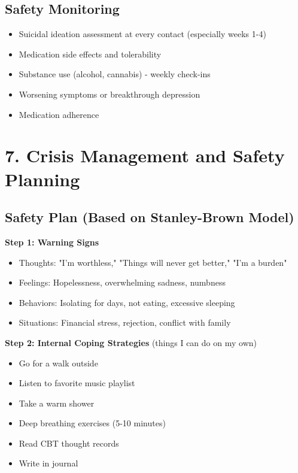 \documentclass[11pt,letterpaper]{article}
\begin{document}
\subsection*{Safety Monitoring}

\begin{itemize}[leftmargin=*]
    \item Suicidal ideation assessment at every contact (especially weeks 1-4)
    \item Medication side effects and tolerability
    \item Substance use (alcohol, cannabis) - weekly check-ins
    \item Worsening symptoms or breakthrough depression
    \item Medication adherence
\end{itemize}

\section*{7. Crisis Management and Safety Planning}

\subsection*{Safety Plan (Based on Stanley-Brown Model)}

\textbf{Step 1: Warning Signs}
\begin{itemize}[leftmargin=*]
    \item Thoughts: "I'm worthless," "Things will never get better," "I'm a burden"
    \item Feelings: Hopelessness, overwhelming sadness, numbness
    \item Behaviors: Isolating for days, not eating, excessive sleeping
    \item Situations: Financial stress, rejection, conflict with family
\end{itemize}

\textbf{Step 2: Internal Coping Strategies} (things I can do on my own)
\begin{itemize}[leftmargin=*]
    \item Go for a walk outside
    \item Listen to favorite music playlist
    \item Take a warm shower
    \item Deep breathing exercises (5-10 minutes)
    \item Read CBT thought records
    \item Write in journal
\end{itemize}
\end{document}
